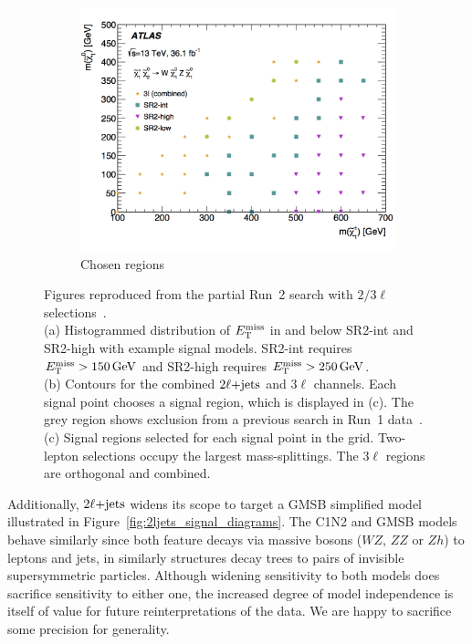 \begin{figure}[tp]
\begin{subfigure}{0.46\textwidth}
\includegraphics[width=\textwidth]{figures/2ljets_23l_chosen_regions.png}
\caption{Chosen regions}
\end{subfigure}
\caption[
Figures reproduced from the partial Run~2 search with $2/3\ell$ selections
]{%
Figures reproduced from the partial Run~2 search with $2/3\ell$
selections~\cite{atlas_23l_SUSY_2016_24, hepdata.81996}.
\\[0.5em]
(a) Histogrammed distribution of $\met$ in and below SR2-int and SR2-high with
example signal models.
SR2-int requires $\met > 150\,\eV[G]$ and SR2-high requires $\met > 250\,\eV[G]$.
\\[0.5em]
(b) Contours for the combined $\twoljets$ and $3\ell$ channels.
Each signal point chooses a signal region, which is displayed in (c).
The grey region shows exclusion from a previous search in Run~1
data~\cite{atlas_2l_SUSY_2013_11}.
\\[0.5em]
(c) Signal regions selected for each signal point in the grid.
Two-lepton selections occupy the largest mass-splittings.
The $3\ell$ regions are orthogonal and combined.
}
\label{fig:2ljets_23l_stuff}
\end{figure}

Additionally, $\twoljets$ widens its scope to target a GMSB simplified model
illustrated in Figure~\ref{fig:2ljets_signal_diagrams}.
The C1N2 and GMSB models behave similarly since both feature decays via massive
bosons ($WZ$, $ZZ$ or $Zh$) to leptons and jets, in similarly structures decay
trees to pairs of invisible supersymmetric particles.
Although widening sensitivity to both models does sacrifice sensitivity to
either one, the increased degree of model independence is itself of value for
future reinterpretations of the data.
We are happy to sacrifice some precision for generality.

